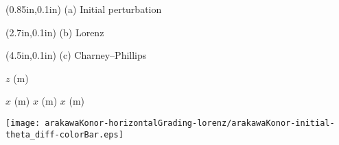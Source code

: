 \documentclass{article}
\begin{document}
\TPMargin{2pt}

\begin{textblock*}{10em}(0.85in,0.1in)
\normalsize
{}
(a) Initial perturbation
\end{textblock*}

\begin{textblock*}{5em}(2.7in,0.1in)
\normalsize
{}
(b) Lorenz
\end{textblock*}

\begin{textblock*}{9em}(4.5in,0.1in)
\normalsize
{}
(c) Charney--Phillips
\end{textblock*}

$z$ (\si{\meter}) 

\vspace{0.5em}
\hspace*{11em}$x$ (\si{\meter}) \hspace*{11em}$x$ (\si{\meter}) \hspace*{11em}$x$ (\si{\meter})

\centering
\texttt{[image: arakawaKonor-horizontalGrading-lorenz/arakawaKonor-initial-theta\_diff-colorBar.eps]}
\end{document}
